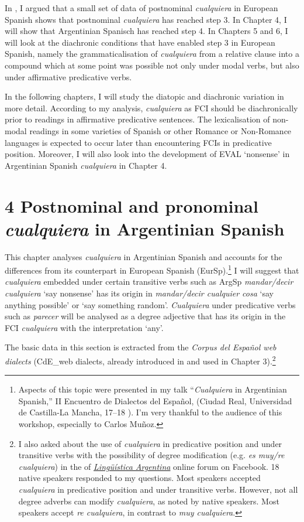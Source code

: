 In , I argued that a small set of data of postnominal \textit{cualquiera} in European Spanish shows that postnominal \textit{cualquiera} has reached step 3. In Chapter 4, I will show that Argentinian Spanisch has reached step 4. In Chapters 5 and 6, I will look at the diachronic conditions that have enabled step 3 in European Spanish, namely the grammaticalisation of \textit{cualquiera} from a relative clause into a compound which at some point was possible not only under modal verbs, but also under affirmative predicative verbs.

  In the following chapters, I will study the diatopic and diachronic variation in more detail. According to my analysis, \textit{cualquiera} as FCI should be diachronically prior to readings in affirmative predicative sentences. The lexicalisation of non-modal readings in some varieties of Spanish or other Romance or Non-Romance languages is expected to occur later than encountering FCIs in predicative position. Moreover, I will also look into the development of EVAL ‘nonsense’ in Argentinian Spanish \textit{cualquiera} in Chapter 4.

\chapter{\textbf{4} \textbf{Postnominal} \textbf{and} \textbf{pronominal} \textbf{\textit{cualquiera} }\textbf{in} \textbf{Argentinian} \textbf{Spanish}}

This chapter analyses \textit{cualquiera} in Argentinian Spanish and accounts for the differences from its counterpart in European Spanish (EurSp).\footnote{{Aspects of this topic were presented in my talk “}{\textit{Cualquiera}} {in Argentinian Spanish,” II Encuentro de Dialectos del Español, (Ciudad Real, Universidad de Castilla-La Mancha, 17–18 \citealt{May2018}). I’m very thankful to the audience of this workshop, especially to Carlos Muñoz.}} I will suggest that \textit{cualquiera} embedded under certain transitive verbs such as ArgSp \textit{mandar/decir cualquiera} ‘say nonsense’ has its origin in \textit{mandar/decir cualquier cosa} ‘say anything possible’ or ‘say something random’. \textit{Cualquiera} under predicative verbs such as \textit{parecer} will be analysed as a degree adjective that has its origin in the FCI \textit{cualquiera} with the interpretation ‘any’.

  The basic data in this section is extracted from the \textit{Corpus del Español web dialects} (CdE\_web dialects, already introduced in  and used in Chapter 3).\footnote{{I also asked about the use of} {\textit{cualquiera}} {in predicative position and under transitive verbs with the possibility of degree modification (e.g.} {\textit{es muy/re cualquiera}}{) in the of} \href{https://www.facebook.com/groups/686284488187168/permalink/992126550936292/}{{{\textit{Lingüística Argentina}}}} {online forum on Facebook}. {18 native speakers responded to my questions. Most speakers accepted} {\textit{cualquiera}} {in predicative position and under transitive verbs. However, not all degree adverbs can modify} {\textit{cualquiera}}{, as noted by native speakers. Most speakers accept} {\textit{re cualquiera}}{, in contrast to} {\textit{muy cualquiera}}.}

